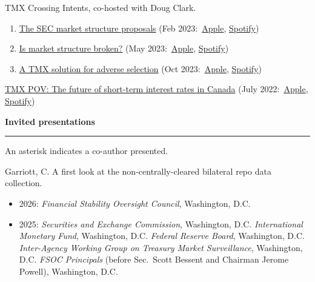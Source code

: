 \documentclass[11pt,letterpaper]{article}
\begin{document}
\medskip
\noindent
TMX Crossing Intents, co-hosted with Doug Clark.
\begin{enumerate}[noitemsep]
\item \href{https://www.tmx.com/pov?id=121&lang=en}{The SEC market structure proposals} (Feb 2023:~\href{https://podcasts.apple.com/us/podcast/episode-021-introducing-crossing-intents-a-look-at/id1618258660?i=1000598358789}{Apple}, \href{https://open.spotify.com/episode/02rZqw4DqsNILMWxrynVW3}{Spotify})

\item \href{https://www.tmx.com/pov?id=121&lang=en}{Is market structure broken?} (May 2023:~\href{https://podcasts.apple.com/us/podcast/episode-026-crossing-intents-is-market-structure-broken/id1618258660?i=1000612302485}{Apple}, \href{https://open.spotify.com/episode/1sVjMNjMMEUBjXQzIO0bT3?si=tr1ldOd3QPKt_IQ5uYEU0g}{Spotify})

\item \href{https://www.tmx.com/pov?id=135&lang=en}{A TMX solution for adverse selection} (Oct 2023:~\href{https://podcasts.apple.com/ca/podcast/episode-029-crossing-intents-tmx-markets-introduce/id1618258660?i=1000631743416}{Apple}, \href{https://open.spotify.com/episode/2fTXFsi5IDAF0ZyaeTEoMh?si=UaB-PbREQzybAoPgRTWwKg&nd=1}{Spotify})

\end{enumerate}

\noindent \href{https://www.tmx.com/pov?id=109&lang=en}{TMX POV: The future of short-term interest rates in Canada} (July 2022:~\href{https://podcasts.apple.com/us/podcast/episode-011-the-future-of-short-term-interest-rates/id1618258660?i=1000569653923}{Apple}, \href{https://open.spotify.com/episode/5AEwLP6WokaSk6K0cbPe1O}{Spotify})


\bigskip
\noindent \textbf{Invited presentations}
\hrule

\medskip
\noindent An asterisk indicates a co-author presented.

\bigskip
\noindent
Garriott, C. A first look at the non-centrally-cleared bilateral repo data collection.
\begin{itemize}[noitemsep]
    \item 2026: \textit{Financial Stability Oversight Council}, Washington, D.C.
    \item 2025: \textit{Securities and Exchange Commission}, Washington, D.C. \textit{International Monetary Fund}, Washington, D.C. \textit{Federal Reserve Board}, Washington, D.C. \textit{Inter-Agency Working Group on Treasury Market Surveillance}, Washington, D.C. \textit{FSOC Principals} (before Sec.~Scott Bessent and Chairman Jerome Powell), Washington, D.C.
\end{itemize}
\end{document}
